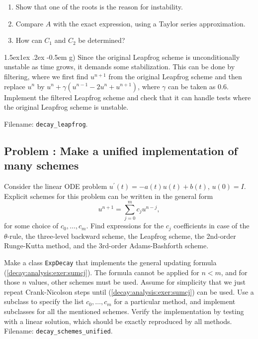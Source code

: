 \documentclass[%
oneside,                 %
final,                   %
10pt]{article}
\makeatletter
\newenvironment{doconceexercise}{}{}
\newcounter{doconceexercisecounter}
\newcommand\subex{\@startsection{paragraph}{4}{\z@}%
                  {1.5ex\@plus1ex \@minus.2ex}%
                  {-0.5em}%
                  {\normalfont\normalsize\bfseries}}
\makeatother
\begin{document}
\begin{doconceexercise}
\begin{enumerate}
\item Show that one of the roots is the reason for instability.

\item Compare $A$ with the exact expression, using a Taylor series approximation.

\item How can $C_1$ and $C_2$ be determined?
\end{enumerate}

\noindent
\subex{g)}
Since the original Leapfrog scheme is unconditionally unstable as time
grows, it demands some stabilization.  This can be done by filtering,
where we first find $u^{n+1}$ from the original Leapfrog scheme and
then replace $u^{n}$ by $u^n + \gamma (u^{n-1} - 2u^n +
u^{n+1})$, where $\gamma$ can be taken as 0.6.  Implement the filtered
Leapfrog scheme and check that it can handle tests where the original
Leapfrog scheme is unstable.


\noindent Filename: \Verb!decay_leapfrog!.

\end{doconceexercise}




\begin{doconceexercise}

\subsection*{Problem \thedoconceexercisecounter: Make a unified implementation of many schemes}

\label{decay:fd2:exer:uni}

Consider the linear ODE problem $u^{\prime}(t)=-a(t)u(t) + b(t)$, $u(0)=I$.
Explicit schemes for this problem can be written in the general form
\begin{equation}
u^{n+1} = \sum_{j=0}^m c_ju^{n-j},
\label{decay:analysis:exer:sumcj}
\end{equation}
for some choice of $c_0,\ldots,c_m$.
Find expressions for the $c_j$ coefficients in case of the
$\theta$-rule, the three-level backward scheme,
the Leapfrog scheme, the 2nd-order Runge-Kutta method,
and the 3rd-order Adams-Bashforth scheme.

Make a class \texttt{ExpDecay} that implements the
general updating formula (\ref{decay:analysis:exer:sumcj}).
The formula cannot be applied for $n < m$, and for those $n$ values, other
schemes must be used. Assume for simplicity that we just
repeat Crank-Nicolson steps until (\ref{decay:analysis:exer:sumcj}) can be used.
Use a subclass
to specify the list $c_0,\ldots,c_m$ for a particular method, and
implement subclasses for all the mentioned schemes.
Verify the implementation by testing with a linear solution, which should
be exactly reproduced by all methods.
\noindent Filename: \Verb!decay_schemes_unified!.

\end{doconceexercise}








\cleardoublepage{}  %
\printindex
\end{document}

